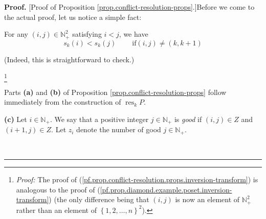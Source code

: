 \documentclass[numbers=enddot,12pt,final,onecolumn,notitlepage]{scrartcl}%
\theoremstyle{definition}
\newenvironment{proof}[1][Proof]{\noindent\textbf{#1.} }{\ \rule{0.5em}{0.5em}}
\newenvironment{verlong}{}{}
\newenvironment{vershort}{}{}
\begin{document}
\begin{proof}
[Proof of Proposition \ref{prop.conflict-resolution-props}.]Before we come to
the actual proof, let us notice a simple fact:

For any $\left(  i,j\right)  \in\mathbb{N}_{+}^{2}$ satisfying $i<j$, we have%
\begin{equation}
s_{k}\left(  i\right)  <s_{k}\left(  j\right)  \ \ \ \ \ \ \ \ \ \ \text{if
}\left(  i,j\right)  \neq\left(  k,k+1\right)
\label{pf.prop.conflict-resolution.props.inversion-transform}%
\end{equation}


\begin{vershort}
(Indeed, this is straightforward to check.)
\end{vershort}

\begin{verlong}
\footnote{\textit{Proof:} The proof of
(\ref{pf.prop.conflict-resolution.props.inversion-transform}) is analogous to
the proof of (\ref{pf.prop.diamond.example.poset.inversion-transform}) (the
only difference being that $\left(  i,j\right)  $ is now an element of
$\mathbb{N}_{+}^{2}$ rather than an element of $\left\{  1,2,\ldots,n\right\}
^{2}$).}
\end{verlong}

Parts \textbf{(a)} and \textbf{(b)} of Proposition
\ref{prop.conflict-resolution-props} follow immediately from the construction
of $\operatorname*{res}\nolimits_{k}P$.

\textbf{(c)} Let $i\in\mathbb{N}_{+}$. We say that a positive integer
$j\in\mathbb{N}_{+}$ is \textit{good} if $\left(  i,j\right)  \in Z$ and
$\left(  i+1,j\right)  \in Z$. Let $z_{i}$ denote the number of good
$j\in\mathbb{N}_{+}$.


\end{proof}
\end{document}
